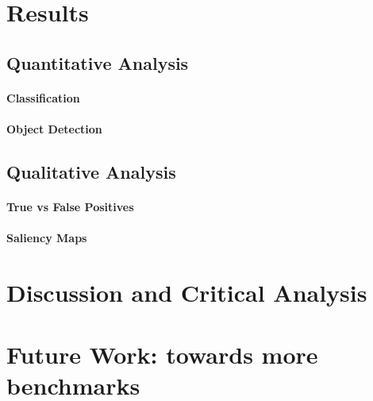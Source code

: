 \section{Results}
\label{sec:results}

\subsection{Quantitative Analysis}
\paragraph{Classification}
\paragraph{Object Detection}



\begin{figure}[htb!]
	\scalebox{0.8}{}
	\caption{}
	\label{fig:detection_experiment_1}
\end{figure}


\begin{figure}[htb!]
	\scalebox{0.8}{}
	\caption{}
	\label{fig:detection_experiment_2}
\end{figure}



\begin{figure}[htb!]
	\scalebox{0.8}{}
	\caption{}
	\label{fig:detection_experiment_3}
\end{figure}


\begin{figure}[htb!]
	\scalebox{0.8}{}
	\caption{}
	\label{fig:detection_experiment_4}
\end{figure}




\subsection{Qualitative Analysis}
\paragraph{True vs False Positives}
\paragraph{Saliency Maps}


\section{Discussion and Critical Analysis}
\label{sec:discussion}


\section{Future Work: towards more benchmarks}
\label{sec:future_work}
